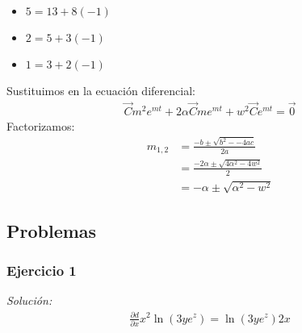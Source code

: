 \documentclass[12pt,openany]{book}
\begin{document}
\begin{itemize}
\begin{itemize}
				\item[\Checkmark] $5 = 13 + 8(-1)$
				
				
				\item[\Checkmark] $2 = 5 + 3(-1)$
				
				\item[\Checkmark] $1 = 3 + 2(-1)$
			\end{itemize}


			
	\end{itemize}
			Sustituimos en la ecuaci\'on diferencial:
				\begin{equation*}
					\begin{split}
						\vec{C}m^{2}e^{mt}+2\alpha\vec{C}me^{mt}+w^{2}\vec{C}e^{mt}=\vec{0}
					\end{split}
				\end{equation*}
				Factorizamos:
				\begin{equation*}
					\begin{split}
						m_{1,2}&=\frac{-b\pm\sqrt{b^{2}--4ac}}{2a} 		 		\\
							   &=\frac{-2\alpha\pm\sqrt{4\alpha^{2}-4w^{2}}}{2}	\\
							   &=-\alpha\pm\sqrt{\alpha^{2}-w^{2}} 
					\end{split}
				\end{equation*}

		\subsection{Problemas}
			\subsubsection{Ejercicio 1}
				\noindent\textsl{Soluci\'on:}	\\
				\begin{equation*}
					\begin{split}
						\frac{\partial d}{\partial x}x^{2}\ln(3ye^{z})=\ln(3ye^{z})2x
					\end{split}
				\end{equation*}
\end{document}

